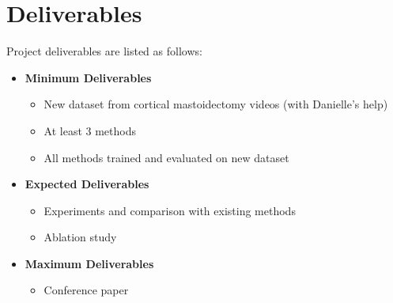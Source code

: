 \documentclass[11pt]{article} \usepackage[top=1in, bottom=1in, left=1in, right=1in]{geometry}
\begin{document}
\section{Deliverables}
Project deliverables are listed as follows:
\begin{itemize}
    \item \textbf{Minimum Deliverables}
    \begin{itemize}
        \item New dataset from cortical mastoidectomy videos (with Danielle's help)
        \item At least 3  methods​
        \item All methods trained and evaluated on new dataset​
    \end{itemize}
    \item \textbf{Expected Deliverables}
    \begin{itemize}
        \item Experiments and comparison with existing methods
        \item Ablation study
    \end{itemize}
    \item \textbf{Maximum Deliverables}
    \begin{itemize}
        \item Conference paper
    \end{itemize}
\end{itemize}

\newpage
\end{document}
